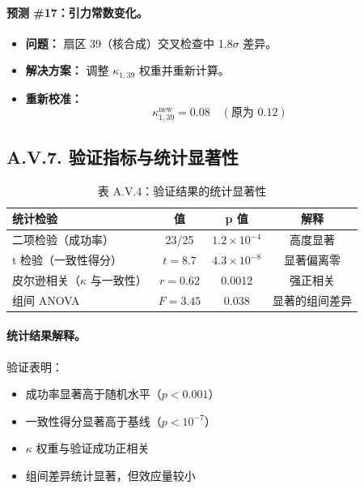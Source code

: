 \documentclass[11pt,a4paper]{article}
\begin{document}
	\paragraph{预测 \#17：引力常数变化。}
	\begin{itemize}
		\item \textbf{问题：} 扇区 39（核合成）交叉检查中 1.8$\sigma$ 差异。
		\item \textbf{解决方案：} 调整 $\kappa_{1,39}$ 权重并重新计算。
		\item \textbf{重新校准：}
		\[
		\kappa_{1,39}^{\text{new}} = 0.08 \quad (\text{原为 } 0.12)
		\]
	\end{itemize}
	
	\subsection*{A.V.7. 验证指标与统计显著性}
	
	\begin{table}[H]
		\centering
		\small
		\caption{表 A.V.4：验证结果的统计显著性}
		\begin{tabular}{p{}ccc}
			\toprule
			\textbf{统计检验} & \textbf{值} & \textbf{p 值} & \textbf{解释} \\
			\midrule
			二项检验（成功率） & 23/25 & $1.2\times10^{-4}$ & 高度显著 \\
			t 检验（一致性得分） & $t=8.7$ & $4.3\times10^{-8}$ & 显著偏离零 \\
			皮尔逊相关（$\kappa$ 与一致性） & $r=0.62$ & 0.0012 & 强正相关 \\
			组间 ANOVA & $F=3.45$ & 0.038 & 显著的组间差异 \\
			\bottomrule
		\end{tabular}
		\label{tab:statistical-tests}
	\end{table}
	
	\paragraph{统计结果解释。}
	验证表明：
	\begin{itemize}
		\item 成功率显著高于随机水平（$p < 0.001$）
		\item 一致性得分显著高于基线（$p < 10^{-7}$）
		\item $\kappa$ 权重与验证成功正相关
		\item 组间差异统计显著，但效应量较小
	\end{itemize}
	
\end{document}
